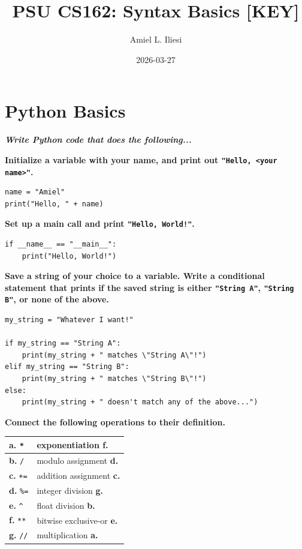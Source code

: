 \documentclass[letterpaper, 12pt]{article}
\title{PSU CS162: Syntax Basics \color{red}\textbf{[KEY]}\normalcolor}
\author{Amiel L. Iliesi}
\date{2026-03-27}
\newcommand{\question}[2][2em]{\textbf{#2}\vspace{#1}\par}
\newcommand{\ans}[1]{\color{Green4}\textbf{#1}\normalcolor}
\begin{document}
\maketitle

\tableofcontents

\pagebreak

\section{Python Basics}

\textbf{\emph{Write Python code that does the following...}}

\vspace{2em}

\question[0pt]{Initialize a variable with your name, and print out
    \texttt{"Hello, <your name>"}.}

\begin{verbatim}
name = "Amiel"
print("Hello, " + name)
\end{verbatim}

\question[0pt]{Set up a main call and print \texttt{"Hello, World!"}.}

\begin{verbatim}
if __name__ == "__main__":
    print("Hello, World!")
\end{verbatim}

\question[0pt]{Save a string of your choice to a variable. Write a conditional statement
    that prints if the saved string is either \texttt{"String A"},
    \texttt{"String B"}, or none of the above.}

\begin{verbatim}
my_string = "Whatever I want!"

if my_string == "String A":
    print(my_string + " matches \"String A\"!")
elif my_string == "String B":
    print(my_string + " matches \"String B\"!")
else:
    print(my_string + " doesn't match any of the above...")
\end{verbatim}


\begin{minipage}{\textwidth}
\question{Connect the following operations to their definition.}
\begin{tabularx}{0.95\linewidth}{| X | X |}
    \hline
    \textbf{a.} \texttt{*} & exponentiation \hfill \ans{f.}\\
    \hline
    \textbf{b.} \texttt{/} & modulo assignment \hfill \ans{d.}\\
    \hline
    \textbf{c.} \texttt{+=} & addition assignment \hfill \ans{c.} \\
    \hline
    \textbf{d.} \texttt{\%=} & integer division \hfill \ans{g.} \\
    \hline
    \textbf{e.} \texttt{\^} & float division \hfill \ans{b.} \\
    \hline
    \textbf{f.} \texttt{**} & bitwise exclusive-or \hfill \ans{e.} \\
    \hline
    \textbf{g.} \texttt{//} & multiplication \hfill \ans{a.} \\
    \hline
\end{tabularx}
\end{minipage}
\end{document}
